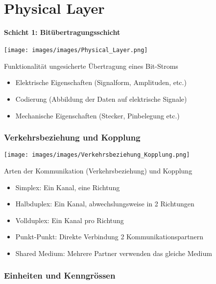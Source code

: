 \section{Physical Layer}
\paragraph{Schicht 1: Bitübertragungsschicht}
\texttt{[image: images/images/Physical\_Layer.png]}

\begin{definition}{Funktionalität}
    ungesicherte Übertragung eines Bit-Stroms
\begin{itemize}
    \item Elektrische Eigenschaften (Signalform, Amplituden, etc.)
    \item Codierung (Abbildung der Daten auf elektrische Signale)
    \item Mechanische Eigenschaften (Stecker, Pinbelegung etc.)
\end{itemize}
\end{definition}

\subsubsection{Verkehrsbeziehung und Kopplung}
\texttt{[image: images/images/Verkehrsbeziehung\_Kopplung.png]}

\begin{concept}{Arten der Kommunikation (Verkehrsbeziehung) und Kopplung}
    \begin{itemize}
        \item Simplex: Ein Kanal, eine Richtung
        \item Halbduplex: Ein Kanal, abwechslungsweise in 2 Richtungen
        \item Vollduplex: Ein Kanal pro Richtung
        \item Punkt-Punkt: Direkte Verbindung 2 Kommunikationspartnern
        \item Shared Medium: Mehrere Partner verwenden das gleiche Medium
    \end{itemize}
\end{concept}

\subsubsection*{Einheiten und Kenngrössen}

